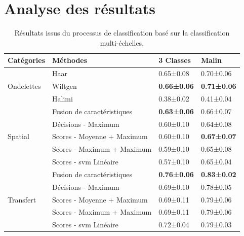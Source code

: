 \section{Analyse des résultats}

\begin{table}[H]
    \centering
    \begin{tabular}{llll}
        \toprule
        Catégories                  & Méthodes                  & 3 Classes         & Malin             \\ \midrule
        \multirow{3}{*}{Ondelettes} & Haar                      & 0.65±0.08         & 0.70±0.06         \\
                                    & Wiltgen~\cite{Wiltgen2008}& \textbf{0.66±0.06}& \textbf{0.71±0.06}\\
                                    & Halimi~\cite{Halimi2017a} & 0.38±0.02         & 0.41±0.04         \\ \midrule
        \multirow{5}{*}{Spatial}    & Fusion de caractéristiques& \textbf{0.63±0.06}& 0.66±0.07         \\
                                    & Décisions - Maximum       & 0.60±0.10         & 0.64±0.08         \\
                                    & Scores - Moyenne + Maximum& 0.60±0.10         & \textbf{0.67±0.07}\\
                                    & Scores - Maximum + Maximum& 0.59±0.10         & 0.65±0.08         \\
                                    & Scores - \gls{svm} Linéaire& 0.57±0.10        & 0.65±0.04         \\ \midrule
        \multirow{5}{*}{Transfert}  & Fusion de caractéristiques& \textbf{0.76±0.06}& \textbf{0.83±0.02}\\
                                    & Décisions - Maximum       & 0.69±0.10         & 0.78±0.05         \\
                                    & Scores - Moyenne + Maximum& 0.69±0.11         & 0.79±0.06         \\
                                    & Scores - Maximum + Maximum& 0.69±0.11         & 0.79±0.06         \\
                                    & Scores - \gls{svm} Linéaire& 0.72±0.04        & 0.79±0.03         \\
        \bottomrule
    \end{tabular}
    \label{tab:image_improvement_multiresolution}
    \caption{Résultats issus du processus de classification basé sur la classification multi-échelles.}
\end{table}


